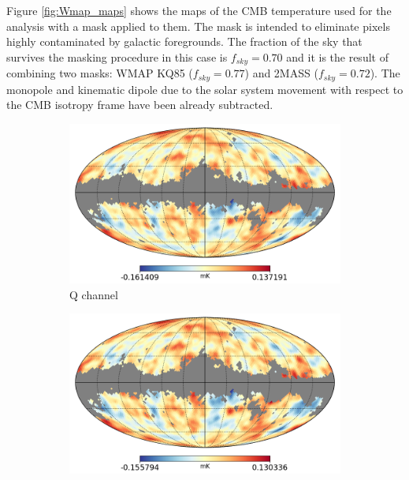 \documentclass[openany,a4paper,12pt,oneside]{book}
\begin{document}
\begin{spacing}{1.5}
Figure \ref{fig:Wmap_maps} shows the maps of the CMB temperature used for the analysis with a mask applied to them. The mask is intended to eliminate pixels highly contaminated by galactic foregrounds. The fraction of the sky that survives the masking procedure in this case is $f_{sky}=0.70$ and it is the result of combining two masks: WMAP KQ85 ($f_{sky}=0.77$) and 2MASS ($f_{sky}=0.72$). The monopole \cite{CMB_temperature:Fixsen_2009} and kinematic dipole due to the solar system movement with respect to the CMB isotropy frame have been already subtracted.

\begin{figure}[!htb]
     \centering
     \begin{subfigure}[b]{0.49\textwidth}
         \centering
         \includegraphics[width=\textwidth]{Imagens/wmap_Q_wmask.png}
         \caption{Q channel}
         \label{fig:Qchannel}
     \end{subfigure}
     \hfill
     \begin{subfigure}[b]{0.49\textwidth}
         \centering
         \includegraphics[width=\textwidth]{Imagens/wmap_V_wmask.png}

\end{subfigure}
\end{figure}
\end{spacing}
\end{document}
